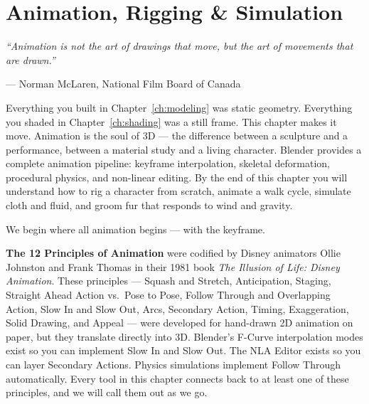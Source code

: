 
\chapter{Animation, Rigging \& Simulation}
\label{ch:animation}

\begin{quotebox}
\itshape ``Animation is not the art of drawings that move, but the art of movements that are drawn.''

\upshape --- Norman McLaren, National Film Board of Canada
\end{quotebox}

\vspace{1em}
Everything you built in Chapter~\ref{ch:modeling} was static geometry. Everything you shaded in Chapter~\ref{ch:shading} was a still frame. This chapter makes it move. Animation is the soul of 3D --- the difference between a sculpture and a performance, between a material study and a living character. Blender provides a complete animation pipeline: keyframe interpolation, skeletal deformation, procedural physics, and non-linear editing. By the end of this chapter you will understand how to rig a character from scratch, animate a walk cycle, simulate cloth and fluid, and groom fur that responds to wind and gravity.

We begin where all animation begins --- with the keyframe.

\begin{historynote}
\textbf{The 12 Principles of Animation} were codified by Disney animators Ollie Johnston and Frank Thomas in their 1981 book \textit{The Illusion of Life: Disney Animation}. These principles --- Squash and Stretch, Anticipation, Staging, Straight Ahead Action vs.\ Pose to Pose, Follow Through and Overlapping Action, Slow In and Slow Out, Arcs, Secondary Action, Timing, Exaggeration, Solid Drawing, and Appeal --- were developed for hand-drawn 2D animation on paper, but they translate directly into 3D. Blender's F-Curve interpolation modes exist so you can implement Slow In and Slow Out. The NLA Editor exists so you can layer Secondary Actions. Physics simulations implement Follow Through automatically. Every tool in this chapter connects back to at least one of these principles, and we will call them out as we go.
\end{historynote}


